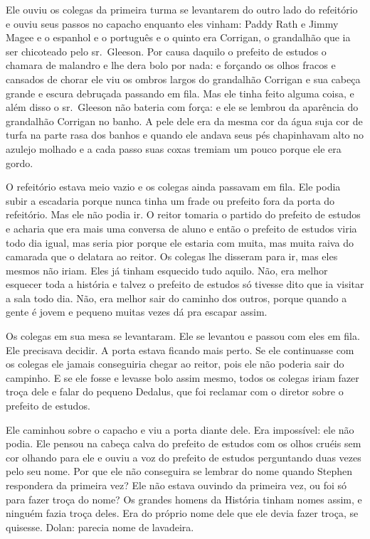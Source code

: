 Ele ouviu os colegas da primeira turma se levantarem do outro lado do
refeitório e ouviu seus passos no capacho enquanto eles vinham: Paddy
Rath e Jimmy Magee e o espanhol e o português e o quinto era Corrigan,
o grandalhão que ia ser chicoteado pelo sr.~Gleeson. Por causa daquilo o
prefeito de estudos o chamara de malandro e lhe dera bolo por
nada: e forçando os olhos fracos e cansados de chorar ele viu os
ombros largos do grandalhão Corrigan e sua cabeça grande e escura
debruçada passando em fila. Mas ele tinha feito alguma coisa, e além
disso o sr.~Gleeson não bateria com força: e ele se lembrou da
aparência do grandalhão Corrigan no banho. A pele dele era da mesma cor
da água suja cor de turfa na parte rasa dos banhos e quando ele andava
seus pés chapinhavam alto no azulejo molhado e a cada passo suas coxas
tremiam um pouco porque ele era gordo.

O refeitório estava meio vazio e os colegas ainda passavam em fila. Ele
podia subir a escadaria porque nunca tinha um frade ou prefeito fora da
porta do refeitório. Mas ele não podia ir. O reitor tomaria o partido do
prefeito de estudos e acharia que era mais uma conversa de aluno e
então o prefeito de estudos viria todo dia igual, mas seria pior porque
ele estaria com muita, mas muita raiva do camarada que o delatara ao
reitor. Os colegas lhe disseram para ir, mas eles mesmos não iriam.
Eles já tinham esquecido tudo aquilo. Não, era melhor esquecer toda a
história e talvez o prefeito de estudos só tivesse dito que ia visitar
a sala todo dia. Não, era melhor sair do caminho dos outros, porque
quando a gente é jovem e pequeno muitas vezes dá pra escapar assim.

Os colegas em sua mesa se levantaram. Ele se levantou e passou com
eles em fila. Ele precisava decidir. A porta estava ficando mais perto.
Se ele continuasse com os colegas ele jamais conseguiria chegar ao
reitor, pois ele não poderia sair do campinho. E se ele fosse e levasse
bolo assim mesmo, todos os colegas iriam fazer troça dele e falar do
pequeno Dedalus, que foi reclamar com o diretor sobre o prefeito de
estudos.

Ele caminhou sobre o capacho e viu a porta diante dele. Era impossível:
ele não podia. Ele pensou na cabeça calva do prefeito de estudos com os
olhos cruéis sem cor olhando para ele e ouviu a voz do prefeito de
estudos perguntando duas vezes pelo seu nome. Por que ele não
conseguira se lembrar do nome quando Stephen respondera da primeira
vez? Ele não estava ouvindo da primeira vez, ou foi só para fazer troça
do nome? Os grandes homens da História tinham nomes assim, e ninguém
fazia troça deles. Era do próprio nome dele que ele devia fazer troça,
se quisesse. Dolan: parecia nome de lavadeira.

